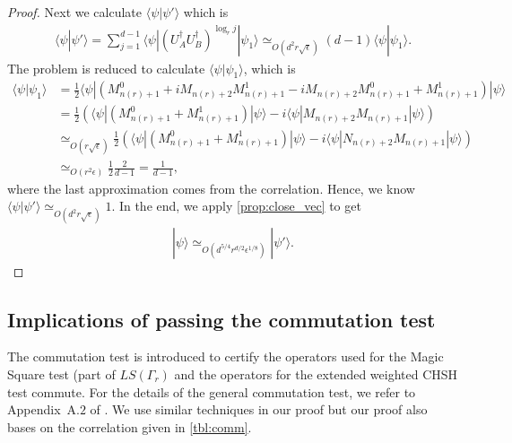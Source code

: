 \documentclass[11pt,letterpaper]{article}
\newcommand{\ket}[1]{|#1\rangle}
\newcommand{\bra}[1]{\langle#1|}
\newcommand{\braket}[2]{\langle#1|#2\rangle}
\newcommand{\ct}{^{\dagger}}
\newcommand{\1}{\mathbb{1}}
\newcommand{\LS}{LS}
\newcommand{\nr}{n(r)}
\newcommand{\ep}{\epsilon}
\newcommand{\se}{\sqrt{\epsilon}}
\newcommand{\appd}[1]{\simeq_{#1}}
\theoremstyle{definition}
\begin{document}
\begin{proof}
	Next we calculate $\braket{\psi}{\psi'}$ which is
	\begin{align*}
		\braket{\psi}{\psi'} = \sum_{j=1}^{d-1} \bra{\psi} (U_A\ct U_B\ct)^{\log_r j} \ket{\psi_1}
		 \appd{O(d^2r\se)} (d-1) \braket{\psi}{\psi_1}.
	\end{align*}
	The problem is reduced to calculate $\braket{\psi}{\psi_1}$, which is
	\begin{align*}
		\braket{\psi}{\psi_1} &= \frac{1}{2} \bra{\psi} (M_{\nr+1}^0 + iM_{\nr+2}M_{\nr+1}^1 - iM_{\nr+2}M_{\nr+1}^0 +M_{\nr+1}^1) \ket{\psi}\\
		& = \frac{1}{2} \left(\bra{\psi}(M_{\nr+1}^0 + M_{\nr+1}^1) \ket{\psi} - i \bra{\psi}M_{\nr+2}M_{\nr+1} \ket{\psi} \right)\\
		& \appd{O(r\se)} \frac{1}{2} \left(\bra{\psi}(M_{\nr+1}^0 + M_{\nr+1}^1) \ket{\psi}  - i \bra{\psi}N_{\nr+2}M_{\nr+1} \ket{\psi} \right)\\
		& \appd{O(r^2 \ep)} \frac{1}{2} \frac{2}{d-1} = \frac{1}{d-1},
	\end{align*}
	where the last approximation comes from the correlation.
	Hence, we know $\braket{\psi}{\psi'} \appd{O(d^2 r \se)} 1$.
	In the end, we apply \cref{prop:close_vec} to get
	\begin{align*}
		\ket{\psi} \appd{O(d^{5/4} r^{d/2} \ep^{1/8})} \ket{\psi'}.
	\end{align*}
\end{proof}


\subsection{Implications of passing the commutation test}
\label{sec:imp_comm}
The commutation test is introduced to certify the operators used for the Magic Square test (part of $\LS(\Gamma_r)$ and 
the operators for the extended weighted CHSH test commute. For the details of the general commutation test, 
we refer to Appendix~A.$2$ of \cite{coladan2017verifier}. 
We use similar techniques in our proof but our proof also bases on the correlation given in \cref{tbl:comm}.
\end{document}
